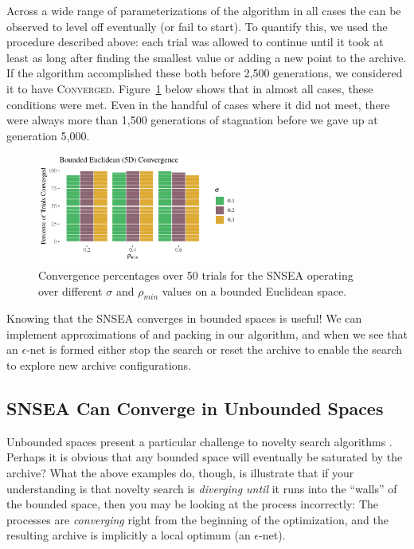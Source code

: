 \documentclass[twoside]{article}
\begin{document}
Across a wide range of parameterizations of the algorithm in all cases the  can be observed to level off eventually (or fail to start).  To quantify this, we used the procedure described above:  each trial was allowed to continue until it took at least as long after finding the smallest  value or adding a new point to the archive.  If the algorithm accomplished these both before 2,500 generations, we considered it to have \textsc{Converged}.  Figure~\ref{fig:bounded:nopop:conv} below shows that in almost all cases, these conditions were met.  Even in the handful of cases where it did not meet, there were always more than 1,500 generations of stagnation before we gave up at generation 5,000.  
%
\begin{figure}[h]
  \center\includegraphics[width=0.6\textwidth]{Figures/bounded-conv-NOPOP.pdf}
  \caption{\label{fig:bounded:nopop:conv} Convergence percentages over 50 trials for the SNSEA operating over different $\sigma$ and $\rho_{min}$ values on a bounded Euclidean space.}
\end{figure}

Knowing that the SNSEA converges in bounded spaces is useful! We can implement approximations of  and packing in our algorithm, and when we see that an $\epsilon$-net is formed either stop the search or reset the archive to enable the search to explore new archive configurations.  


\subsection{SNSEA Can Converge in Unbounded Spaces}
\label{subsec:unbounded}

Unbounded spaces present a particular challenge to novelty search algorithms \citep{LehmanStanley2008ssls,Doncieux2019gecco}.  Perhaps it is obvious that any bounded space will eventually be saturated by the archive?  What the above examples do, though, is illustrate that if your understanding is that novelty search is \emph{diverging until} it runs into the ``walls'' of the bounded space, then you may be looking at the process incorrectly:  The processes are \emph{converging} right from the beginning of the optimization, and the resulting archive is implicitly a local optimum (an $\epsilon$-net).
\end{document}
